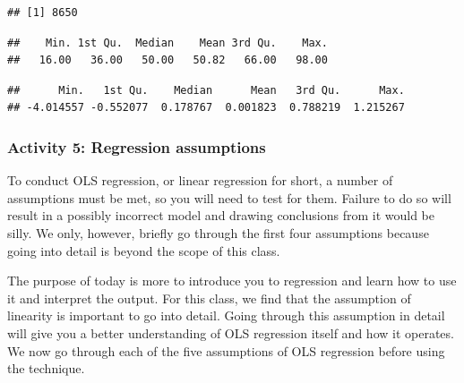 \documentclass[
]{book}
\newenvironment{Shaded}{\begin{snugshade}}{\end{snugshade}}
\newcommand{\CommentTok}[1]{\textcolor[rgb]{0.56,0.35,0.01}{\textit{#1}}}
\newcommand{\FunctionTok}[1]{\textcolor[rgb]{0.00,0.00,0.00}{#1}}
\newcommand{\NormalTok}[1]{#1}
\newcommand{\SpecialCharTok}[1]{\textcolor[rgb]{0.00,0.00,0.00}{#1}}
\begin{document}
\begin{verbatim}
## [1] 8650
\end{verbatim}

\begin{Shaded}
\end{Shaded}

\begin{verbatim}
##    Min. 1st Qu.  Median    Mean 3rd Qu.    Max. 
##   16.00   36.00   50.00   50.82   66.00   98.00
\end{verbatim}

\begin{Shaded}
\end{Shaded}

\begin{verbatim}
##      Min.   1st Qu.    Median      Mean   3rd Qu.      Max. 
## -4.014557 -0.552077  0.178767  0.001823  0.788219  1.215267
\end{verbatim}

\hypertarget{activity-5-regression-assumptions}{%
\subsubsection{Activity 5: Regression assumptions}\label{activity-5-regression-assumptions}}

To conduct OLS regression, or linear regression for short, a number of assumptions must be met, so you will need to test for them. Failure to do so will result in a possibly incorrect model and drawing conclusions from it would be silly. We only, however, briefly go through the first four assumptions because going into detail is beyond the scope of this class.

The purpose of today is more to introduce you to regression and learn how to use it and interpret the output. For this class, we find that the assumption of linearity is important to go into detail. Going through this assumption in detail will give you a better understanding of OLS regression itself and how it operates. We now go through each of the five assumptions of OLS regression before using the technique.
\end{document}
